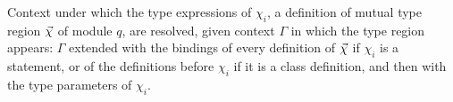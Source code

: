 Context under which the type expressions of $\chi_i$, a definition of mutual type region $\seq{\chi}$ of module $q$, are
resolved, given context $\Gamma$ in which the type region appears: $\Gamma$ extended with the bindings of every
definition of $\seq{\chi}$ if $\chi_i$ is a  statement, or of the definitions before $\chi_i$ if it is a
class definition, and then with the type parameters of $\chi_i$.

